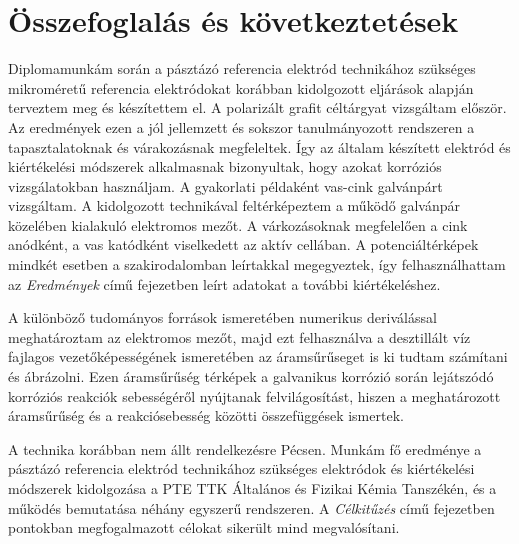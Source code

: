 \chapter{Összefoglalás és következtetések}
\pagestyle{headings}

Diplomamunkám során a pásztázó referencia elektród technikához szükséges mikroméretű referencia elektródokat korábban kidolgozott eljárások alapján terveztem meg és készítettem el. A polarizált grafit céltárgyat vizsgáltam először. Az eredmények ezen a jól jellemzett és sokszor tanulmányozott rendszeren a tapasztalatoknak és várakozásnak megfeleltek. Így az általam készített elektród és kiértékelési módszerek alkalmasnak bizonyultak, hogy azokat korróziós vizsgálatokban használjam. A gyakorlati példaként vas-cink galvánpárt vizsgáltam. A kidolgozott technikával feltérképeztem a működő galvánpár közelében kialakuló elektromos mezőt. A várkozásoknak megfelelően a cink anódként, a vas katódként viselkedett az aktív cellában. A potenciáltérképek mindkét esetben a szakirodalomban leírtakkal megegyeztek, így felhasználhattam az \emph{Eredmények} című fejezetben leírt adatokat a további kiértékeléshez.

A különböző tudományos források ismeretében numerikus deriválással meghatároztam az elektromos mezőt, majd ezt felhasználva a desztillált víz fajlagos vezetőképességének ismeretében az áramsűrűseget is ki tudtam számítani és ábrázolni. Ezen áramsűrűség térképek a galvanikus korrózió során lejátszódó korróziós reakciók sebességéről nyújtanak felvilágosítást, hiszen a meghatározott áramsűrűség és a reakciósebesség közötti összefüggések ismertek.

A technika korábban nem állt rendelkezésre Pécsen. Munkám fő eredménye a pásztázó referencia elektród technikához szükséges elektródok és kiértékelési módszerek kidolgozása a PTE TTK Általános és Fizikai Kémia Tanszékén, és a működés bemutatása néhány egyszerű rendszeren. A \emph{Célkitűzés} című fejezetben pontokban megfogalmazott célokat sikerült mind megvalósítani.
